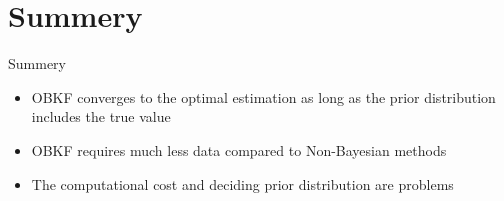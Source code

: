 \section{Summery}
\begin{frame}
    \tableofcontents[currentsection]
\end{frame}

\begin{frame}{Summery}
\begin{itemize}
    \item OBKF converges to the optimal estimation as long as the prior distribution includes the true value
    \item OBKF requires much less data compared to Non-Bayesian methods
    \item The computational cost and deciding prior distribution are problems
\end{itemize}
\end{frame}